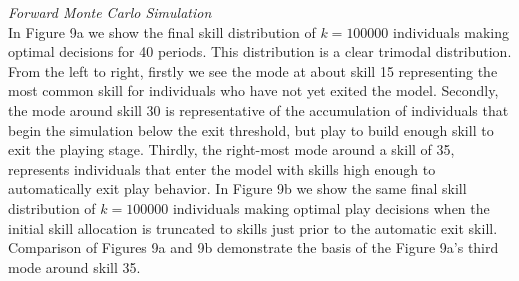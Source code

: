 \documentclass[12pt, letterpaper, fleqn]{article}
\begin{document}
	\noindent \textit{Forward Monte Carlo Simulation}\\
	In Figure 9a we show the final skill distribution of $k=100000$ individuals making optimal decisions for 40 periods.
	This distribution is a clear trimodal distribution. %
	From the left to right, firstly we see the mode at about skill 15 representing the most common skill for individuals who have not yet exited the model.
	Secondly, the mode around skill 30 is representative of the accumulation of individuals that begin the simulation below the exit threshold, but play to build enough skill to exit the playing stage. %
	Thirdly, the right-most mode around a skill of 35, represents individuals that enter the model with skills high enough to automatically exit play behavior.
	In Figure 9b we show the same final skill distribution of $k=100000$ individuals making optimal play decisions when the initial skill allocation is truncated to skills just prior to the automatic exit skill.
	Comparison of Figures 9a and 9b demonstrate the basis of the Figure 9a's third mode around skill 35.
	
	
	
	
\end{document}
